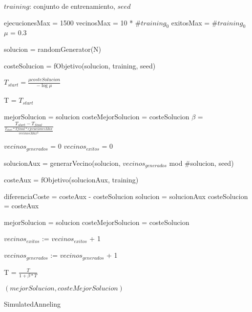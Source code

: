 \documentclass{article}
\begin{document}
\begin{algorithm}
\begin{algorithmic}[1]
	\REQUIRE $training$: conjunto de entrenamiento, $seed$

	\STATE ejecucionesMax = 1500
	\STATE vecinosMax = 10 * $\#training_0$
	\STATE exitosMax = $\#training_0$
	\STATE $\mu$ = 0.3
	
	\REPEAT
		\STATE solucion = randomGenerator(N)

		\STATE costeSolucion = fObjetivo(solucion, training, seed)

		\STATE $T_{start} = \frac{\mu costeSolucion}{-\log{\mu}}$

	\STATE T = $T_{start}$
	
	\STATE mejorSolucion = solucion
	\STATE costeMejorSolucion = costeSolucion
	\STATE $\beta$ = $\frac{T_{start} - T_{final}}{\frac{T_{start}*T{final}*ejecucionesMax}{vecinosMax^2}}$

	\REPEAT
		\STATE $vecinos_{generados}$ = 0
		\STATE $vecinos_{exitos}$ = 0

		\REPEAT
			\STATE solucionAux = generarVecino(solucion,  $vecinos_{generados}$ mod \#solucion, seed)

			\STATE costeAux = fObjetivo(solucionAux, training)

			\STATE diferenciaCoste = costeAux - costeSolucion
				\STATE solucion = solucionAux
				\STATE costeSolucion = costeAux

					\STATE mejorSolucion = solucion
					\STATE costeMejorSolucion = costeSolucion
				\ENDIF

			\STATE $vecinos_{exitos}$ := $vecinos_{exitos}$ + 1
			\ENDIF

			\STATE $vecinos_{generados}$ := $vecinos_{generados}$ + 1

		T = $\frac{T}{1 + \beta * T}$

	
	
	\RETURN $(mejorSolucion, costeMejorSolucion)$
\end{algorithmic}
\caption{SimulatedAnneling}
\end{algorithm}
\end{document}
